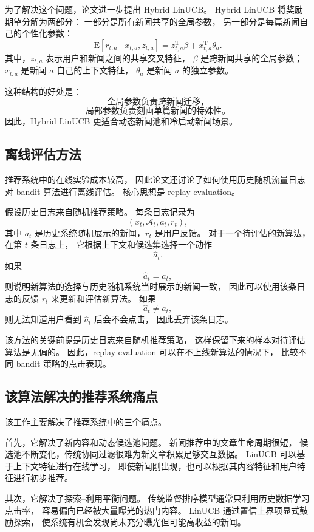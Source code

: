 \documentclass[11pt]{ctexart}
\begin{document}
为了解决这个问题，论文进一步提出 Hybrid LinUCB。
Hybrid LinUCB 将奖励期望分解为两部分：
一部分是所有新闻共享的全局参数，
另一部分是每篇新闻自己的个性化参数：
\[
\mathrm{E}[r_{t,a}\mid x_{t,a},z_{t,a}]
=
z_{t,a}^{\mathrm{T}}\beta
+
x_{t,a}^{\mathrm{T}}\theta_a.
\]
其中，$z_{t,a}$ 表示用户和新闻之间的共享交叉特征，
$\beta$ 是跨新闻共享的全局参数；
$x_{t,a}$ 是新闻 $a$ 自己的上下文特征，
$\theta_a$ 是新闻 $a$ 的独立参数。

这种结构的好处是：
\[
\text{全局参数负责跨新闻迁移，}
\]
\[
\text{局部参数负责刻画单篇新闻的特殊性。}
\]
因此，Hybrid LinUCB 更适合动态新闻池和冷启动新闻场景。

\subsection{离线评估方法}

推荐系统中的在线实验成本较高，
因此论文还讨论了如何使用历史随机流量日志对 bandit 算法进行离线评估。
核心思想是 replay evaluation。

假设历史日志来自随机推荐策略。
每条日志记录为
\[
(x_t,\mathcal{A}_t,a_t,r_t),
\]
其中 $a_t$ 是历史系统随机展示的新闻，$r_t$ 是用户反馈。
对于一个待评估的新算法，在第 $t$ 条日志上，
它根据上下文和候选集选择一个动作
\[
\hat{a}_t.
\]
如果
\[
\hat{a}_t=a_t,
\]
则说明新算法的选择与历史随机系统当时展示的新闻一致，
因此可以使用该条日志的反馈 $r_t$ 来更新和评估新算法。
如果
\[
\hat{a}_t\neq a_t,
\]
则无法知道用户看到 $\hat{a}_t$ 后会不会点击，
因此丢弃该条日志。

该方法的关键前提是历史日志来自随机推荐策略，
这样保留下来的样本对待评估算法是无偏的。
因此，replay evaluation 可以在不上线新算法的情况下，
比较不同 bandit 策略的点击表现。

\subsection{该算法解决的推荐系统痛点}

该工作主要解决了推荐系统中的三个痛点。

首先，它解决了新内容和动态候选池问题。
新闻推荐中的文章生命周期很短，
候选池不断变化，传统协同过滤很难为新文章积累足够交互数据。
LinUCB 可以基于上下文特征进行在线学习，
即使新闻刚出现，也可以根据其内容特征和用户特征进行初步推荐。

其次，它解决了探索--利用平衡问题。
传统监督排序模型通常只利用历史数据学习点击率，
容易偏向已经被大量曝光的热门内容。
LinUCB 通过置信上界项显式鼓励探索，
使系统有机会发现尚未充分曝光但可能高收益的新闻。
\end{document}
